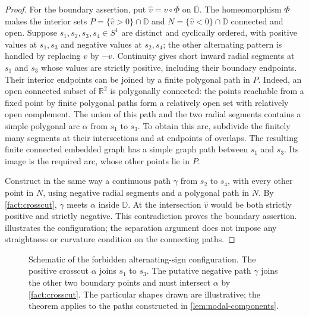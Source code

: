 \begin{proof}
For the boundary assertion, put $\widehat v=v\circ\Phi$ on
$\overline{\mathbb D}$. The homeomorphism $\Phi$ makes the interior
sets $P=\{\widehat v>0\}\cap\mathbb D$ and
$N=\{\widehat v<0\}\cap\mathbb D$ connected and open.
Suppose $s_1,s_2,s_3,s_4\in S^1$ are distinct and cyclically ordered,
with positive values at $s_1,s_3$ and negative values at $s_2,s_4$;
the other alternating pattern is handled by replacing $v$ by $-v$.
Continuity gives short inward radial segments at $s_1$ and $s_3$
whose values are strictly positive, including their boundary endpoints.
Their interior endpoints can be joined by a finite polygonal path in
$P$. Indeed, an open connected subset of $\mathbb R^2$ is polygonally
connected: the points reachable from a fixed point by finite polygonal
paths form a relatively open set with relatively open complement.
The union of this path and the two radial segments contains a simple
polygonal arc $\alpha$ from $s_1$ to $s_3$. To obtain this arc,
subdivide the finitely many segments
at their intersections and at endpoints of overlaps. The resulting
finite connected embedded graph has a simple graph path between
$s_1$ and $s_3$. Its image is the required arc, whose other points
lie in $P$.

Construct in the same way a continuous path $\gamma$ from $s_2$ to
$s_4$, with every other point in $N$, using negative radial segments
and a polygonal path in $N$. By \cref{fact:crosscut}, $\gamma$ meets
$\alpha$ inside $\mathbb D$. At the intersection $\widehat v$ would
be both strictly positive and strictly negative. This contradiction
proves the boundary assertion.  illustrates
the configuration; the separation argument does not impose any
straightness or curvature condition on the connecting paths.
\end{proof}

\begin{figure}[htbp]
\centering
{}
\caption{Schematic of the forbidden alternating-sign configuration.
The positive crosscut $\alpha$ joins $s_1$ to $s_3$. The putative
negative path $\gamma$ joins the other two boundary points and must
intersect $\alpha$ by \cref{fact:crosscut}. The particular shapes drawn
are illustrative; the theorem applies to the paths constructed in
\cref{lem:nodal-components}.}\label{fig:alternating-signs}
\end{figure}

